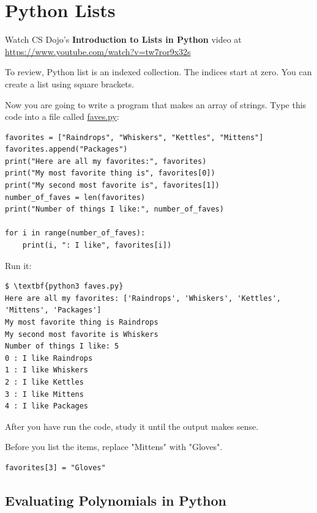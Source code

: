 \chapter{Python Lists}

Watch CS Dojo's \textbf{Introduction to Lists in Python} video at \url{https://www.youtube.com/watch?v=tw7ror9x32s}

To review, Python list is an indexed collection. The indices start at
zero. You can create a list using square brackets.

Now you are going to write a program that makes an array of
strings. Type this code into a file called \url{faves.py}:

\begin{Verbatim}
favorites = ["Raindrops", "Whiskers", "Kettles", "Mittens"]
favorites.append("Packages")
print("Here are all my favorites:", favorites)
print("My most favorite thing is", favorites[0])
print("My second most favorite is", favorites[1])
number_of_faves = len(favorites)
print("Number of things I like:", number_of_faves)

for i in range(number_of_faves):
    print(i, ": I like", favorites[i])
\end{Verbatim}

Run it:
\begin{Verbatim}[commandchars=\\\{\}]
$ \textbf{python3 faves.py}
Here are all my favorites: ['Raindrops', 'Whiskers', 'Kettles', 'Mittens', 'Packages']
My most favorite thing is Raindrops
My second most favorite is Whiskers
Number of things I like: 5
0 : I like Raindrops
1 : I like Whiskers
2 : I like Kettles
3 : I like Mittens
4 : I like Packages
\end{Verbatim}
After you have run the code, study it until the output makes sense.

\begin{Exercise}[title={Assign into list}, label=assignintolist]
  Before you list the items, replace "Mittens" with "Gloves".
\end{Exercise}
\begin{Answer}[ref=assignintolist]
\begin{Verbatim}
favorites[3] = "Gloves"
\end{Verbatim}
\end{Answer}

\section{Evaluating Polynomials in Python}

